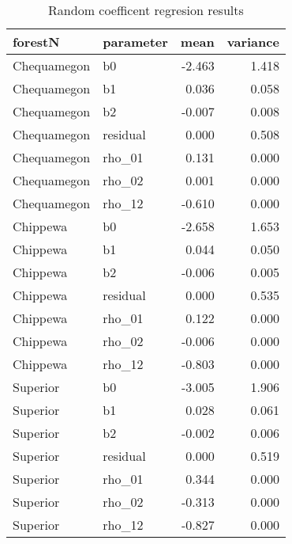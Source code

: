 \begin{table}[ht]
\begin{center}
\begin{tabular}{llrr}
  \hline
forestN & parameter & mean & variance \\ 
  \hline
Chequamegon & b0 & -2.463 & 1.418 \\ 
  Chequamegon & b1 & 0.036 & 0.058 \\ 
  Chequamegon & b2 & -0.007 & 0.008 \\ 
  Chequamegon & residual & 0.000 & 0.508 \\ 
  Chequamegon & rho\_01 & 0.131 & 0.000 \\ 
  Chequamegon & rho\_02 & 0.001 & 0.000 \\ 
  Chequamegon & rho\_12 & -0.610 & 0.000 \\ 
  Chippewa & b0 & -2.658 & 1.653 \\ 
  Chippewa & b1 & 0.044 & 0.050 \\ 
  Chippewa & b2 & -0.006 & 0.005 \\ 
  Chippewa & residual & 0.000 & 0.535 \\ 
  Chippewa & rho\_01 & 0.122 & 0.000 \\ 
  Chippewa & rho\_02 & -0.006 & 0.000 \\ 
  Chippewa & rho\_12 & -0.803 & 0.000 \\ 
  Superior & b0 & -3.005 & 1.906 \\ 
  Superior & b1 & 0.028 & 0.061 \\ 
  Superior & b2 & -0.002 & 0.006 \\ 
  Superior & residual & 0.000 & 0.519 \\ 
  Superior & rho\_01 & 0.344 & 0.000 \\ 
  Superior & rho\_02 & -0.313 & 0.000 \\ 
  Superior & rho\_12 & -0.827 & 0.000 \\ 
   \hline
\end{tabular}
\caption{Random coefficent regresion results}
\end{center}
\end{table}

